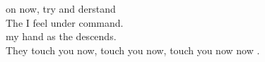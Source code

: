  on now, try and derstand \\
The  I feel under  command. \\
 my hand as the  descends. \\
They  touch you now,  touch you now,  touch you now now . \\

